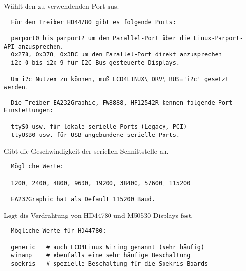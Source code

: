 \begin{description}

  Wählt den zu verwendenden Port aus.

\begin{example}
\begin{verbatim}
  Für den Treiber HD44780 gibt es folgende Ports:

  parport0 bis parport2 um den Parallel-Port über die Linux-Parport-API anzusprechen.
  0x278, 0x378, 0x3BC um den Parallel-Port direkt anzusprechen
  i2c-0 bis i2x-9 für I2C Bus gesteuerte Displays.

  Um i2c Nutzen zu können, muß LCD4LINUX\_DRV\_BUS='i2c' gesetzt werden.
\end{verbatim}
\end{example}

\begin{example}
\begin{verbatim}
  Die Treiber EA232Graphic, FW8888, HP12542R kennen folgende Port Einstellungen:

  ttyS0 usw. für lokale serielle Ports (Legacy, PCI)
  ttyUSB0 usw. für USB-angebundene serielle Ports.
\end{verbatim}
\end{example}


  Gibt die Geschwindigkeit der seriellen Schnittstelle an.

\begin{example}
\begin{verbatim}
  Mögliche Werte:

  1200, 2400, 4800, 9600, 19200, 38400, 57600, 115200

  EA232Graphic hat als Default 115200 Baud.
\end{verbatim}
\end{example}


  Legt die Verdrahtung von HD44780 und M50530 Displays fest.

\begin{example}
\begin{verbatim}
  Mögliche Werte für HD44780:

  generic	# auch LCD4Linux Wiring genannt (sehr häufig)
  winamp	# ebenfalls eine sehr häufige Beschaltung
  soekris	# spezielle Beschaltung für die Soekris-Boards
\end{verbatim}
\end{example}


\end{description}
